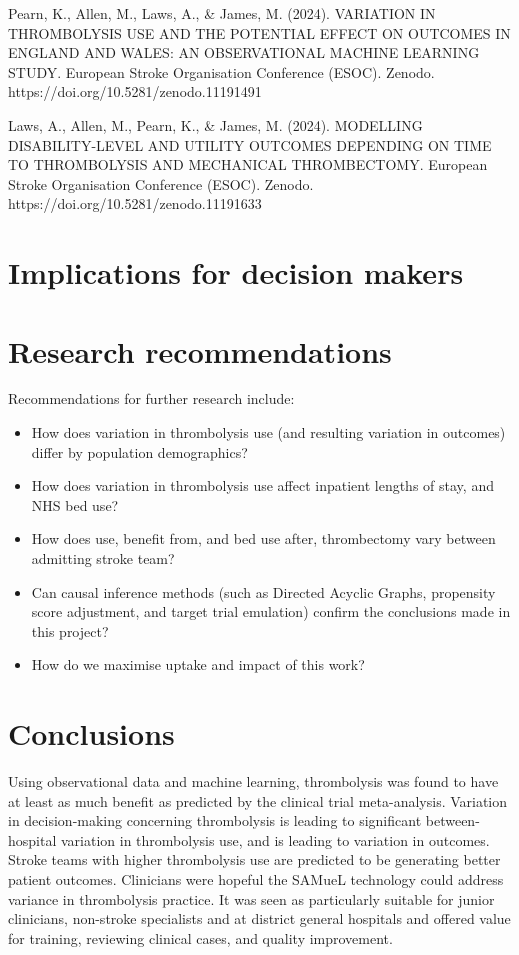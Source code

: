 Pearn, K., Allen, M., Laws, A., \& James, M. (2024). VARIATION IN THROMBOLYSIS USE AND THE POTENTIAL EFFECT ON OUTCOMES IN ENGLAND AND WALES: AN OBSERVATIONAL MACHINE LEARNING STUDY. European Stroke Organisation Conference (ESOC). Zenodo. https://doi.org/10.5281/zenodo.11191491

Laws, A., Allen, M., Pearn, K., \& James, M. (2024). MODELLING DISABILITY-LEVEL AND UTILITY OUTCOMES DEPENDING ON TIME TO THROMBOLYSIS AND MECHANICAL THROMBECTOMY. European Stroke Organisation Conference (ESOC). Zenodo. https://doi.org/10.5281/zenodo.11191633

\section{Implications for decision makers}

\section{Research recommendations}

Recommendations for further research include:

\begin{itemize}

    \item How does variation in thrombolysis use (and resulting variation in outcomes) differ by population demographics?

    \item How does variation in thrombolysis use affect inpatient lengths of stay, and NHS bed use?

    \item How does use, benefit from, and bed use after, thrombectomy vary between admitting stroke team?

    \item Can causal inference methods (such as Directed Acyclic Graphs, propensity score adjustment, and target trial emulation) confirm the conclusions made in this project?

    \item How do we maximise uptake and impact of this work?
    
\end{itemize}


\section{Conclusions}

Using observational data and machine learning, thrombolysis was found to have at least as much benefit as predicted by the clinical trial meta-analysis. Variation in decision-making concerning thrombolysis is leading to significant between-hospital variation in thrombolysis use, and is leading to variation in outcomes. Stroke teams with higher thrombolysis use are predicted to be generating better patient outcomes. Clinicians were hopeful the SAMueL technology could address variance in thrombolysis practice. It was seen as particularly suitable for junior clinicians, non-stroke specialists and at district general hospitals and offered value for training, reviewing clinical cases, and quality improvement.

